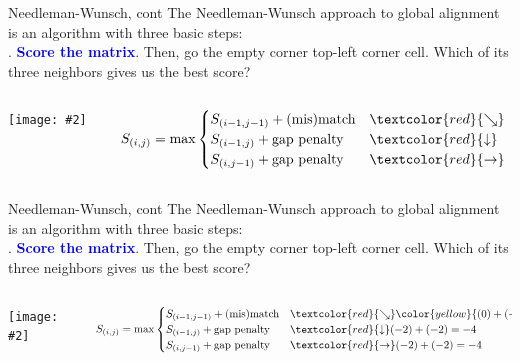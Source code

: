 \documentclass{beamer}
\renewcommand{\c}[1]{\begin{center}#1\end{center}}
\newcommand{\blu}[1]{\textcolor{blue}{\textbf{#1}}}
\newcommand{\gr}[2][.95]{\c{\texttt{[image: \#2]}}}
\begin{document}
\begin{frame}{Needleman-Wunsch, cont}
The Needleman-Wunsch approach to global alignment is an algorithm with three basic steps:\\
. \blu{Score the matrix}. Then, go the empty corner top-left corner cell. Which of its three neighbors gives us the best score?
\begin{columns}
\begin{column}{0.5\textwidth}
    \gr{l3_figs/s33_nw.png}
\end{column}
\begin{column}{0.5\textwidth}
\tiny
\[
S_{(i,j)} = \max \begin{cases}
    S_{(i-1,j-1)} + \text{(mis)match} &\textcolor{red}{\searrow}\\
    S_{(i-1,j)} + \text{gap penalty} &\textcolor{red}{\downarrow}\\
    S_{(i,j-1)} + \text{gap penalty} &\textcolor{red}{\rightarrow}
\end{cases}
\]
\end{column}
\end{columns}
\end{frame}

\begin{frame}{Needleman-Wunsch, cont}
The Needleman-Wunsch approach to global alignment is an algorithm with three basic steps:\\
. \blu{Score the matrix}. Then, go the empty corner top-left corner cell. Which of its three neighbors gives us the best score?
\begin{columns}
\begin{column}{0.5\textwidth}
    \gr{l3_figs/s34_nw.png}
\end{column}
\begin{column}{0.5\textwidth}
\tiny
\[
S_{(i,j)} = \max \begin{cases}
    S_{(i-1,j-1)} + \text{(mis)match} &\textcolor{red}{\searrow} \color{yellow}{(0) + (+1) = +1} \text{(MAX)}\\
    S_{(i-1,j)} + \text{gap penalty} &\textcolor{red}{\downarrow} (-2) + (-2) = -4\\
    S_{(i,j-1)} + \text{gap penalty} &\textcolor{red}{\rightarrow} (-2) + (-2) = -4
\end{cases}
\]
\end{column}
\end{columns}
\end{frame}
\end{document}
